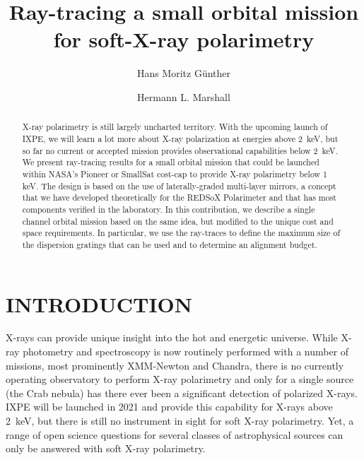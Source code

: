 \documentclass[]{spie}  %
\title{Ray-tracing a small orbital mission for soft-X-ray polarimetry}
\author[a]{Hans Moritz G\"unther}
\author[a]{Hermann L. Marshall}
\affil[a]{MIT Kavli Institute for Astrophysics and Space Research, Massachusetts Institute of Technology, Cambridge, MA 02139, USA}
\begin{document}
 
\maketitle

\begin{abstract}
X-ray polarimetry is still largely uncharted territory. With the upcoming launch of IXPE, we will learn a lot more about X-ray polarization at energies above 2~keV, but so far no current or accepted mission provides observational capabilities below 2~keV. We present ray-tracing results for a small orbital mission that could be launched within NASA's Pioneer or SmallSat cost-cap to provide X-ray polarimetry below 1 keV. The design is based on the use of laterally-graded multi-layer mirrors, a concept that we have developed theoretically for the REDSoX Polarimeter\cite{redsox} and that has most components verified in the laboratory.
In this contribution, we describe a single channel orbital mission based on the same idea, but modified to the unique cost and space requirements. In particular, we use the ray-traces to define the maximum size of the dispersion gratings that can be used and to determine an alignment budget.

\end{abstract}


\section{INTRODUCTION}
\label{sec:intro}
X-rays can provide unique insight into the hot and energetic universe. While X-ray photometry and spectroscopy is now routinely performed with a number of missions, most prominently XMM-Newton and Chandra, there is no currently operating observatory to perform X-ray polarimetry and only for a single source (the Crab nebula) has there ever been a significant detection of polarized X-rays\cite{1972ApJ...174L...1N,1978ApJ...220L.117W}.
IXPE\cite{IXPE} will be launched in 2021 and provide this capability for X-rays above 2~keV, but there is still no instrument in sight for soft X-ray polarimetry. Yet, a range of open science questions for several classes of astrophysical sources can only be answered with soft X-ray polarimetry.
\end{document}
